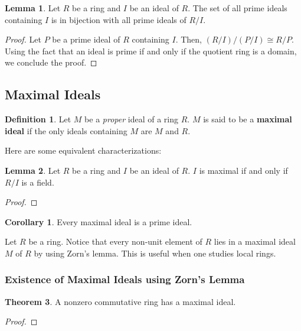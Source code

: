 \documentclass{article}
\theoremstyle{definition}
\newtheorem{definition}{Definition}
\newtheorem{theorem}{Theorem}[section]
\newtheorem{lemma}[theorem]{Lemma}
\newtheorem{corollary}{Corollary}[theorem]
\begin{document}
\begin{lemma}
    Let $R$ be a ring and $I$ be an ideal of $R$. The set of all prime ideals containing $I$ is in bijection
    with all prime ideals of $R/I$.
\end{lemma}
\begin{proof}
    Let $P$ be a prime ideal of $R$ containing $I$. Then, $(R/I)/(P/I) \cong R/P$. Using the 
    fact that an ideal is prime if and only if the quotient ring is a domain, we conclude the proof.
\end{proof}

\newpage

\subsection{Maximal Ideals}

\begin{definition}
    Let $M$ be a \textit{proper} ideal of a ring $R$. $M$ is said to be a \textbf{maximal ideal}
    if the only ideals containing $M$ are $M$ and $R$.
\end{definition}

Here are some equivalent characterizations:

\begin{lemma}
    Let $R$ be a ring and $I$ be an ideal of $R$.
    $I$ is maximal if and only if $R/I$ is a field.
\end{lemma}
\begin{proof}
    
\end{proof}
\begin{corollary}
    Every maximal ideal is a prime ideal.
\end{corollary}

Let $R$ be a ring. Notice that every non-unit element of $R$ lies
in a maximal ideal $M$ of $R$ by using Zorn's lemma. This is useful when
one studies local rings.

\subsubsection{Existence of Maximal Ideals using Zorn's Lemma}

\begin{theorem}
    A nonzero commutative ring has a maximal ideal.
\end{theorem}
\begin{proof}
    
\end{proof}
\end{document}
